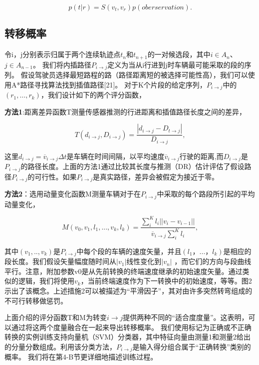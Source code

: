 \begin{equation*}
p(t|r)=S(v_{t},v_{r})p(oberservation).
\end{equation*}

\subsection{转移概率}
令i，j分别表示归属于两个连续轨迹点$t_{n}$和$t_{n+1}$的一对候选段，其中$i\in A_{n}$、$j\in A_{n-1}$。 我们将内插路径$P_{i\to j}$定义为当从i行进到j时车辆最可能采取的段的序列。 假设驾驶员选择最短路程的路（路径距离短的被选择可能性高），我们可以使用A*路径寻找算法找到插值路径[21]。 对于K个片段的给定序列，$P_{i\to j}$中的$(r_{1},…,r_{k})$，我们设计如下的两个评分函数，

\textbf{方法1}:距离差异函数T测量传感器推测的行进距离和插值路径长度之间的差异，

\begin{equation*}
T(d_{i\to j},D_{i\to j})=\frac{|d_{i\to j}-D_{t\to j}|}{D_{i\to j}},
\end{equation*}

这里$d_{i\to j}=\overline{v}_{i\to j}\Delta t$是车辆在时间间隔，以平均速度$\overline{v}_{i\to j}$行驶的距离,而$D_{i\to j}$是$P_{i\to j}$的路径长度。上面的方法1通过比较其长度与推测（DR）估计评估了假设路径$P_{i\to j}$的可行性。如果$P_{i\to j}$是真实路径，差异会被假定为接近于零。

\textbf{方法2}：选用动量变化函数M测量车辆对于在$P_{i\to j}$中采取的每个路段所引起的平均动量变化，

\begin{equation*}
M(v_{0},v_{1},l_{1},...,v_{k},l_{k})=\frac{\sum_{i}^{K}l_{i}||v_{i}-v_{i-1}||}{\overline{v}_{i\to j}\sum_{i}^{K}l_{i}},
\end{equation*}

其中$(v_{1},..,v_{k})$是$P_{i\to j}$中每个段的车辆的速度矢量，并且$(l_{1}，...，l_{k})$是相应的段长度。我们假设矢量幅度随时间从$|v_{1}|$线性变化到$|v_{n}|$ ，而它们的方向与段曲线平行。注意，附加参数v0是从先前转换的终端速度继承的初始速度矢量。通过类似的逻辑，我们将使用$v_{k}$，当前终端速度作为下一转换中的初始速度，等等。图2示出了该概念。上述措施2可以被描述为“平滑因子”，其对由许多突然转弯组成的不可行转移做惩罚。

上面介绍的评分函数T和M为转变$i\to j$提供两种不同的“适合度度量”。这表明，可以通过将这两个度量融合在一起来导出转移概率。 我们使用标记为正确或不正确转换的实例训练支持向量机（SVM）分类器，其中特征向量由测量1和测量2给出的分量分数组成。利用该分类方法，$P_{i\to j}$是输入得分组合属于“正确转换”类别的概率。 我们将在第4-B节更详细地描述训练过程。

